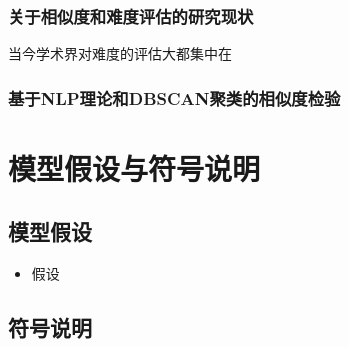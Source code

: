\subsubsection{关于相似度和难度评估的研究现状}

当今学术界对难度的评估大都集中在\cite{xuTimunandupinggufangfayanjiuzongshu2022}

\subsubsection{基于NLP理论和DBSCAN聚类的相似度检验}

\subsubsection{}

%
%

\section{模型假设与符号说明}

\subsection{模型假设}

\begin{itemize}
    \item 假设 
\end{itemize}

\subsection{符号说明}